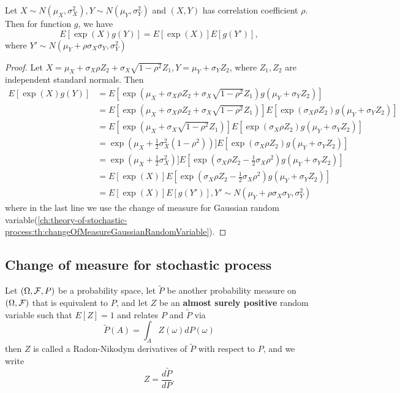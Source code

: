 \begin{refsection}
\begin{lemma}\label{ch:theory-of-stochastic-process:th:changeOfMeasureBivariateGaussian}
	Let $X\sim N(\mu_X,\sigma_X^2), Y\sim N(\mu_Y,\sigma_Y^2)$ and $(X,Y)$ has correlation coefficient $\rho$. Then for function $g$, we have
	$$E[\exp(X)g(Y)] = E[\exp(X)]E[g(Y')],$$
	where $Y'\sim N(\mu_Y + \rho \sigma_X\sigma_Y,\sigma_Y^2)$
\end{lemma}
\begin{proof}
	Let $X = \mu_X + \sigma_X\rho Z_2 + \sigma_X\sqrt{1-\rho^2}Z_1, Y = \mu_Y + \sigma_YZ_2$, where $Z_1,Z_2$ are independent standard normals. Then
	\begin{align*}
	E[\exp(X)g(Y)] &= E[\exp(\mu_X + \sigma_X\rho Z_2 + \sigma_X\sqrt{1-\rho^2}Z_1)g(\mu_Y + \sigma_YZ_2)] \\
	&=E[\exp(\mu_X + \sigma_X\rho Z_2 + \sigma_X\sqrt{1-\rho^2}Z_1)]E[\exp(\sigma_X\rho Z_2)g(\mu_Y + \sigma_YZ_2)] \\
	&=E[\exp(\mu_X + \sigma_X\sqrt{1-\rho^2}Z_1)]E[\exp(\sigma_X\rho Z_2)g(\mu_Y + \sigma_YZ_2)] \\
	&=\exp(\mu_X + \frac{1}{2}\sigma_X^2(1-\rho^2))]E[\exp(\sigma_X\rho Z_2)g(\mu_Y + \sigma_YZ_2)] \\
	&=\exp(\mu_X + \frac{1}{2}\sigma_X^2)]E[\exp(\sigma_X\rho Z_2 - \frac{1}{2}\sigma_X\rho^2)g(\mu_Y + \sigma_YZ_2)] \\
	&= E[\exp(X)]E[\exp(\sigma_X\rho Z_2 - \frac{1}{2}\sigma_X\rho^2)g(\mu_Y + \sigma_YZ_2)] \\
	&= E[\exp(X)]E[g(Y')], Y'\sim N(\mu_Y+\rho \sigma_X\sigma_Y,\sigma_Y^2) 
	\end{align*}
	where in the last line we use the change of measure for Gaussian random variable(\autoref{ch:theory-of-stochastic-process:th:changeOfMeasureGaussianRandomVariable}).
\end{proof}

\subsection{Change of measure for stochastic process}
\begin{definition}
	\cite[37]{shreve2004stochastic2}Let $(\Omega,\mathcal{F},P)$ be a probability space, let $\tilde{P}$ be another probability measure on $(\Omega,\mathcal{F})$ that is equivalent to $P$, and let $Z$ be an \textbf{almost surely positive} random variable such that $E[Z]=1$ and relates $P$ and $\tilde{P}$ via
	$$\tilde{P}(A)=\int_A Z(\omega)dP(\omega)$$
	then $Z$ is called a Radon-Nikodym derivatives of $\tilde{P}$ with respect to $P$, and we write
	$$Z = \frac{d\tilde{P}}{dP}.$$
\end{definition}


\end{refsection}
